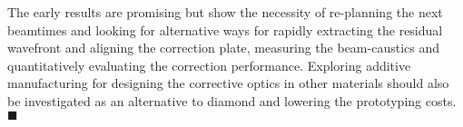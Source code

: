 \begin{refsection}
The early results are promising but show the necessity of re-planning the next beamtimes and looking for alternative ways for rapidly extracting the residual wavefront and aligning the correction plate, measuring the beam-caustics and quantitatively evaluating the correction performance. Exploring additive manufacturing for designing the corrective optics in other materials should also be investigated as an alternative to diamond and lowering the prototyping costs. $\blacksquare$

\printbibliography[heading=subbibliography]
\end{refsection}

